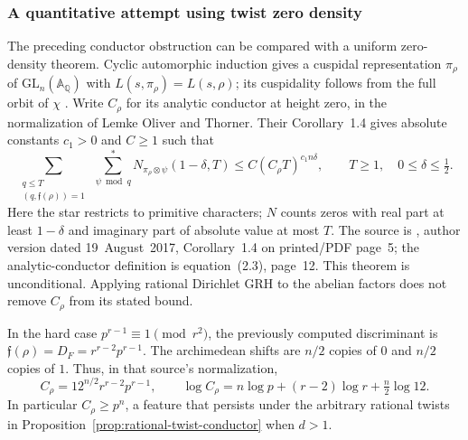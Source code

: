 \documentclass[11pt]{article}
\theoremstyle{definition}
\theoremstyle{remark}
\begin{document}
\subsubsection{A quantitative attempt using twist zero density}

The preceding conductor obstruction can be compared with a uniform zero-density theorem. Cyclic automorphic induction gives a cuspidal
representation \(\pi_\rho\) of \(\mathrm{GL}_n(\mathbb A_{\mathbb Q})\)
with \(L(s,\pi_\rho)=L(s,\rho)\); its cuspidality follows from the full
orbit of \(\chi\)
\citep[Chapter~III, \S6, Theorem~6.2 and Lemma~6.4, pp.~215--218; \S7, p.~220]{ArthurClozel1989}.
Write \(C_\rho\) for its analytic conductor at height zero, in the
normalization of Lemke Oliver and Thorner.
Their Corollary~1.4 gives absolute constants \(c_1>0\) and \(C\geq1\)
such that
\begin{equation}\label{eq:LOT-twist-density}
 \sum_{\substack{q\leq T\\(q,\mathfrak f(\rho))=1}}
 \ \sum_{\psi\bmod q}^{*}
 N_{\pi_\rho\otimes\psi}(1-\delta,T)
 \leq C(C_\rho T)^{c_1n\delta},
 \qquad T\geq1,\quad 0\leq\delta\leq\tfrac12.
\end{equation}
Here the star restricts to primitive characters; \(N\) counts zeros
with real part at least \(1-\delta\) and imaginary part of absolute
value at most \(T\).
The source is \citet{LemkeOliverThorner2019}, author version dated
19~August~2017, Corollary~1.4 on printed/PDF page~5;
the analytic-conductor definition is equation~(2.3), page~12.
This theorem is unconditional. Applying rational Dirichlet GRH to
the abelian factors does not remove \(C_\rho\) from its stated bound.

In the hard case \(p^{r-1}\equiv1\pmod{r^2}\), the previously computed
discriminant is
\(\mathfrak f(\rho)=D_F=r^{r-2}p^{r-1}\).
The archimedean shifts are \(n/2\) copies of \(0\) and \(n/2\) copies
of \(1\). Thus, in that source's normalization,
\begin{equation}\label{eq:twist-analytic-conductor}
 C_\rho=12^{n/2}r^{r-2}p^{r-1},
 \qquad
 \log C_\rho
 =n\log p+(r-2)\log r+\tfrac n2\log12.
\end{equation}
In particular \(C_\rho\geq p^n\), a feature that persists under the
arbitrary rational twists in
Proposition~\ref{prop:rational-twist-conductor} when \(d>1\).
\end{document}
